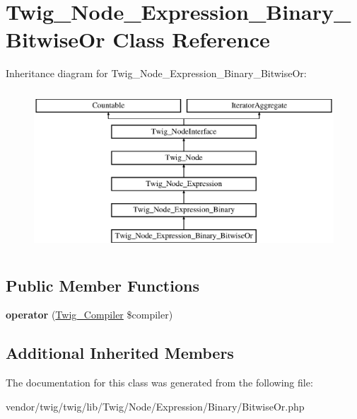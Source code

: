 \hypertarget{classTwig__Node__Expression__Binary__BitwiseOr}{}\section{Twig\+\_\+\+Node\+\_\+\+Expression\+\_\+\+Binary\+\_\+\+Bitwise\+Or Class Reference}
\label{classTwig__Node__Expression__Binary__BitwiseOr}
Inheritance diagram for Twig\+\_\+\+Node\+\_\+\+Expression\+\_\+\+Binary\+\_\+\+Bitwise\+Or\+:\begin{figure}[H]
\begin{center}
\leavevmode
\includegraphics[height=6.000000cm]{classTwig__Node__Expression__Binary__BitwiseOr}
\end{center}
\end{figure}
\subsection*{Public Member Functions}
\begin{DoxyCompactItemize}
\item 
{\bfseries operator} (\hyperlink{classTwig__Compiler}{Twig\+\_\+\+Compiler} \$compiler)\hypertarget{classTwig__Node__Expression__Binary__BitwiseOr_a23114781b23756cf5598f8a7f72dca68}{}\label{classTwig__Node__Expression__Binary__BitwiseOr_a23114781b23756cf5598f8a7f72dca68}

\end{DoxyCompactItemize}
\subsection*{Additional Inherited Members}


The documentation for this class was generated from the following file\+:\begin{DoxyCompactItemize}
\item 
vendor/twig/twig/lib/\+Twig/\+Node/\+Expression/\+Binary/Bitwise\+Or.\+php\end{DoxyCompactItemize}
